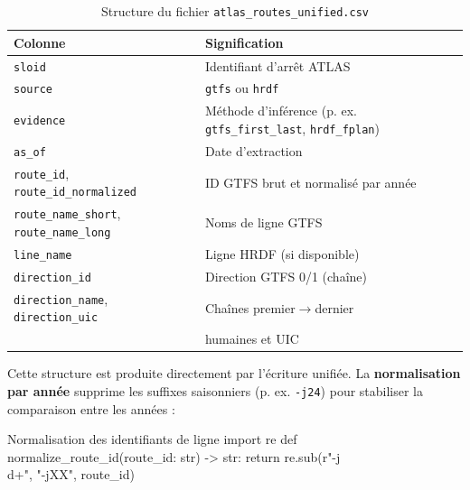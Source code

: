 \begin{table}[H]
\caption{Structure du fichier \texttt{atlas\_routes\_unified.csv}}
\label{tab:atlas_routes_unified}
\centering
\small
\begin{tabular}{|l|p{8cm}|}
\hline
Colonne & Signification \\
\hline
\texttt{sloid} & Identifiant d'arrêt ATLAS\\
\hline
\texttt{source} & \texttt{gtfs} ou \texttt{hrdf}\\
\hline
\texttt{evidence} & Méthode d'inférence (p. ex. \texttt{gtfs\_first\_last}, \texttt{hrdf\_fplan})\\
\hline
\texttt{as\_of} & Date d'extraction\\
\hline
\texttt{route\_id}, \texttt{route\_id\_normalized} & ID GTFS brut et normalisé par année\\
\hline
\texttt{route\_name\_short}, \texttt{route\_name\_long} & Noms de ligne GTFS\\
\hline
\texttt{line\_name} & Ligne HRDF (si disponible)\\
\hline
\texttt{direction\_id} & Direction GTFS 0/1 (chaîne)\\
\hline
\texttt{direction\_name}, \texttt{direction\_uic} & Chaînes premier$\rightarrow$dernier\\
& humaines et UIC\\
\hline
\end{tabular}
\end{table}
Cette structure est produite directement par l'écriture unifiée. La \textbf{normalisation par année} supprime les suffixes saisonniers (p. ex. \texttt{-j24}) pour stabiliser la comparaison entre les années :

\begin{codebox}[language=Python]{Normalisation des identifiants de ligne}
import re
def normalize_route_id(route_id: str) -> str:
    return re.sub(r"-j\\d+", "-jXX", route_id)
\end{codebox}

